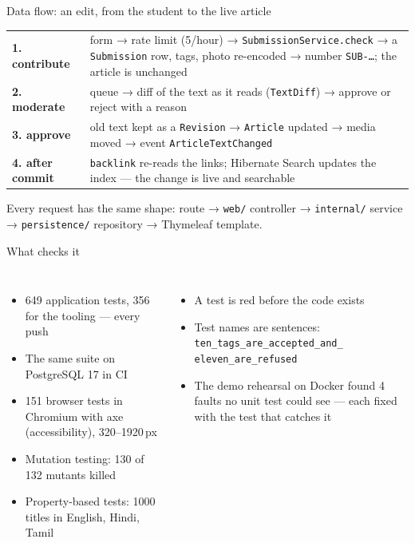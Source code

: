 \documentclass[aspectratio=169,11pt]{beamer}
\begin{document}
\begin{frame}{Data flow: an edit, from the student to the live article}
\small
\begin{tabularx}{\textwidth}{@{}lX@{}}
\toprule
\textbf{1. contribute} & form → rate limit (5/hour) → \texttt{SubmissionService.check} → a
\texttt{Submission} row, tags, photo re-encoded → number \texttt{SUB-…}; the article is unchanged \\
\textbf{2. moderate} & queue → diff of the text as it reads (\texttt{TextDiff}) → approve or reject
with a reason \\
\textbf{3. approve} & old text kept as a \texttt{Revision} → \texttt{Article} updated → media moved →
event \texttt{ArticleTextChanged} \\
\textbf{4. after commit} & \texttt{backlink} re-reads the links; Hibernate Search updates the index
--- the change is live and searchable \\
\bottomrule
\end{tabularx}
\vspace{0.6em}

Every request has the same shape: \alert{route → \texttt{web/} controller → \texttt{internal/}
service → \texttt{persistence/} repository → Thymeleaf template}.
\end{frame}

\begin{frame}{What checks it}
\begin{columns}[T]
\small
\begin{itemize}
\item \alert{649} application tests, \alert{356} for the tooling --- every push
\item The same suite on \alert{PostgreSQL 17} in CI
\item \alert{151} browser tests in Chromium with axe (accessibility), 320--1920\,px
\item \alert{Mutation testing}: 130 of 132 mutants killed
\item \alert{Property-based} tests: 1000 titles in English, Hindi, Tamil
\end{itemize}
\small
\begin{itemize}
\item A test is red before the code exists
\item Test names are sentences:\\
  {\scriptsize\texttt{ten\_tags\_are\_accepted\_and\_}\\\texttt{eleven\_are\_refused}}
\item The demo rehearsal on Docker found 4 faults no unit test could see --- each fixed with the
  test that catches it
\end{itemize}
\end{columns}
\end{frame}
\end{document}

